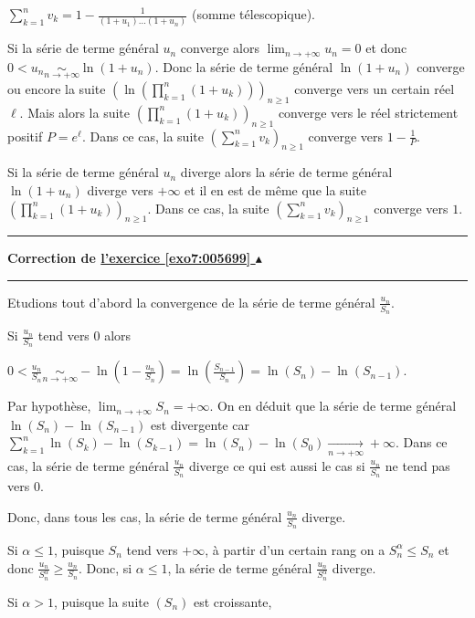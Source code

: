 \documentclass[11pt,a4paper]{article}
\newcounter{exo}
\newcommand{\correction}[1]{\hypertarget{cor7:#1}{}\label{cor7:#1}{\bf Correction de \hyperlink{exo7:#1}{l'exercice \ref{exo7:#1} $\blacktriangle$}}\vspace{1mm}\hrule\vspace{1mm}}
\newcommand{\fincorrection}{\vspace{1mm}\hrule\vspace*{7mm}}
\begin{document}
\begin{center}
$\sum_{k=1}^{n}v_k =1-\frac{1}{(1+u_1)\ldots(1+u_n)}$ (somme télescopique).
\end{center}

Si la série de terme général $u_n$ converge alors $\lim_{n \rightarrow +\infty}u_n=0$ et donc $0<u_n\underset{n\rightarrow+\infty}{\sim}\ln(1+u_n)$. Donc la série de terme général $\ln(1+u_n)$ converge ou encore la suite  $\left(\ln\left(\prod_{k=1}^{n}(1+u_k)\right)\right)_{n\geqslant1}$
converge vers un certain réel $\ell$. Mais alors la suite $\left(\prod_{k=1}^{n}(1+u_k)\right)_{n\geqslant1}$ converge vers le réel strictement positif $P=e^{\ell}$.
Dans ce cas, la suite $\left(\sum_{k=1}^{n}v_k\right)_{n\geqslant1}$ converge vers $1-\frac{1}{P}$.

Si la série de terme général $u_n$ diverge alors la série de terme général $\ln(1+u_n)$ diverge vers $+\infty$ et il en est de même que la suite $\left(\prod_{k=1}^{n}(1+u_k)\right)_{n\geqslant1}$. Dans ce cas, la suite $\left(\sum_{k=1}^{n}v_k\right)_{n\geqslant1}$ converge vers $1$.
\fincorrection
\correction{005699}
Etudions tout d'abord la convergence de la série de terme général $\frac{u_n}{S_n}$.

Si  $\frac{u_n}{S_n}$ tend vers $0$ alors

\begin{center}
$0<\frac{u_n}{S_n}\underset{n\rightarrow+\infty}{\sim}-\ln\left(1-\frac{u_n}{S_n}\right)=\ln\left(\frac{S_{n-1}}{S_n}\right)=\ln(S_n) -\ln(S_{n-1})$.
\end{center}

Par hypothèse, $\lim_{n \rightarrow +\infty}S_n=+\infty$. On en déduit que la série de terme général $\ln(S_n) - \ln(S_{n-1})$ est divergente car  $\sum_{k=1}^{n}\ln(S_k) - \ln(S_{k-1}) =\ln(S_n)-\ln(S_0)\underset{n\rightarrow+\infty}{\rightarrow}+\infty$. Dans ce cas, la série de terme général $\frac{u_n}{S_n}$  diverge ce qui est aussi le cas si $\frac{u_n}{S_n}$ ne tend pas vers $0$.

Donc, dans tous les cas, la série de terme général $\frac{u_n}{S_n}$  diverge.

Si $\alpha\leqslant1$, puisque $S_n$ tend vers $+\infty$, à partir d'un certain rang on a $S_n^\alpha\leqslant S_n$ et donc  $\frac{u_n}{S_n^\alpha}\geqslant\frac{u_n}{S_n}$. Donc, si $\alpha\leqslant1$, la série de terme général  $\frac{u_n}{S_n^\alpha}$ diverge.

Si $\alpha> 1$, puisque la suite $(S_n)$ est croissante,
\end{document}
